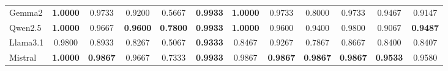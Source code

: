 \begin{table}[h!]
{\begin{tabular}{lcccccccccc||c}
            Gemma2                             & \textbf{1.0000}                                         & 0.9733                                                  & 0.9200                                                  & 0.5667                                                            & \textbf{0.9933}                                         & \textbf{1.0000}                                           & 0.9733                                                            & 0.8000                                                  & 0.9733                                 & 0.9467                                   & 0.9147 \\
            Qwen2.5                            & \textbf{1.0000}                                         & 0.9667                                                  & \textbf{0.9600}                                         & \textbf{0.7800}                                                            & \textbf{0.9933}                                         & \textbf{1.0000}                                           & 0.9600                                                            & 0.9400                                                  & 0.9800                                 & 0.9067                                   & \textbf{0.9487} \\
            Llama3.1                           & 0.9800                                                  & 0.8933                                                  & 0.8267                                                  & 0.5067                                                            & \textbf{0.9333}                                         & 0.8467                                                    & 0.9267                                                            & 0.7867                                                  & 0.8667                                 & 0.8400                                   & 0.8407 \\
            Mistral                            & \textbf{1.0000}                                         & \textbf{0.9867}                                                  & 0.9667                                                  & 0.7333                                                            & \textbf{0.9933}                                         & 0.9867                                                    & \textbf{0.9867}                                                   & \textbf{0.9867}                                                  & \textbf{0.9867}                        & \textbf{0.9533}                          & 0.9580 \\

\end{tabular}}
\end{table}
